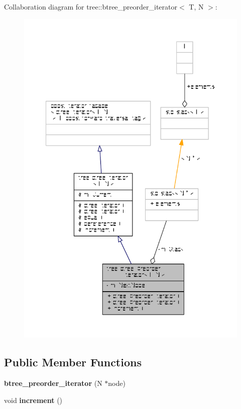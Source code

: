 Collaboration diagram for tree\-:\-:btree\-\_\-preorder\-\_\-iterator$<$ T, N $>$\-:
\nopagebreak
\begin{figure}[H]
\begin{center}
\leavevmode
\includegraphics[width=350pt]{classtree_1_1btree__preorder__iterator__coll__graph}
\end{center}
\end{figure}
\subsection*{Public Member Functions}
\begin{DoxyCompactItemize}
\item 
\hypertarget{classtree_1_1btree__preorder__iterator_a2d2e4be80bd9f420f209465b595fb146}{{\bfseries btree\-\_\-preorder\-\_\-iterator} (N $\ast$node)}\label{classtree_1_1btree__preorder__iterator_a2d2e4be80bd9f420f209465b595fb146}

\item 
\hypertarget{classtree_1_1btree__preorder__iterator_afa601bda88a4be48f38d6438260f0001}{void {\bfseries increment} ()}\label{classtree_1_1btree__preorder__iterator_afa601bda88a4be48f38d6438260f0001}

\end{DoxyCompactItemize}
